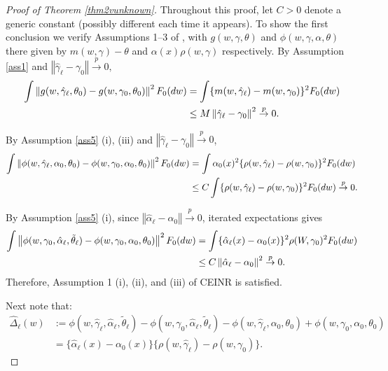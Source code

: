\documentclass[aos]{imsart}
\numberwithin{equation}{section}
\theoremstyle{plain}
\theoremstyle{remark}
\begin{document}
\begin{appendix}
\begin{proof}[Proof of Theorem \ref{thm2vunknown}] Throughout this proof, let $C > 0$ denote a generic constant (possibly different each time it appears). To show the first conclusion we verify
Assumptions 1--3 of \cite[CEINR]{chernozhukov2022locally}, with $g(w,\gamma,\theta)$ and $\phi(w,\gamma,\alpha,\theta)$
there given by $m(w,\gamma)-\theta$ and $\alpha(x)\rho(w,\gamma)$
respectively. By Assumption \ref{ass1} and $\left\Vert \hat{\gamma}_{\ell}-\gamma
_{0}\right\Vert \overset{p}{\to} 0,$
\begin{align}
\int\left\Vert g(w,\hat{\gamma}_{\ell},\theta_{0})-g(w,\gamma_{0},\theta
_{0})\right\Vert ^{2}F_{0}(dw)& =\int\{m(w,\hat{\gamma}_{\ell})-m(w,\gamma
_{0})\}^{2}F_{0}(dw) \notag \\ & \leq M \left\Vert \hat{\gamma}_{\ell}-\gamma_{0}\right\Vert
^{2}\overset{p}{\to}0. \label{Ass1i}
\end{align}

By Assumption \ref{ass5} (i), (iii) and $\left\Vert \hat{\gamma}_{\ell}-\gamma
_{0}\right\Vert \overset{p}{\to} 0$,
\begin{align}
\int\left\Vert \phi(w,\hat{\gamma}_{\ell},\alpha_{0},\theta_{0}%
)-\phi(w,\gamma_{0},\alpha_{0},\theta_{0})\right\Vert ^{2}F_{0}%
(dw) &= \int \alpha_{0}(x)^{2}\{ \rho(w, \hat{\gamma}_{\ell})-\rho(w,\gamma_{0})\}^{2}F_{0}(dw) \notag \\
&  \leq C \int \{ \rho(w, \hat{\gamma}_{\ell})-\rho(w,\gamma_{0})\}^{2}F_{0}(dw)
\overset{p}{\to}0. \label{Ass1ii}
\end{align}

By Assumption \ref{ass5} (i), since $\left\Vert \hat{\alpha
}_{\ell}-\alpha_{0}\right\Vert \overset{p}{\to}0$, iterated
expectations gives%
\begin{align}
\int\left\Vert \phi(w,\gamma_{0},\hat{\alpha}_{\ell},\tilde{\theta}_{\ell
})-\phi(w,\gamma_{0},\alpha_{0},\theta_{0})\right\Vert ^{2}F_{0}%
(dw) 
&  =\int\{\hat{\alpha}_{\ell}(x)-\alpha_{0}(x)\}^{2}\rho(W,\gamma_0)^{2}%
F_{0}(dw) \notag \\ & \leq C\left\Vert \hat{\alpha}_{\ell}-\alpha_{0}\right\Vert
^{2}\overset{p}{\to}0. \label{Ass1iii}
\end{align}
Therefore, Assumption 1 (i), (ii), and (iii) of CEINR is satisfied.

Next note that:
\begin{align*}
\hat{\Delta}_{\ell}(w)  &  :=\phi(w,\hat{\gamma}_{\ell},\hat{\alpha}_{\ell
},\tilde{\theta}_{\ell})-\phi(w,\gamma_{0},\hat{\alpha}_{\ell},\tilde{\theta
}_{\ell})-\phi(w,\hat{\gamma}_{\ell},\alpha_{0},\theta_{0})+\phi(w,\gamma
_{0},\alpha_{0},\theta_{0})\\
&  = \{\hat{\alpha}_{\ell}(x)-\alpha_{0}(x)\}\{\rho(w, \hat{\gamma}_{\ell})-\rho(w,\gamma_{0})\}. 
\end{align*}



\end{proof}
\end{appendix}
\end{document}
